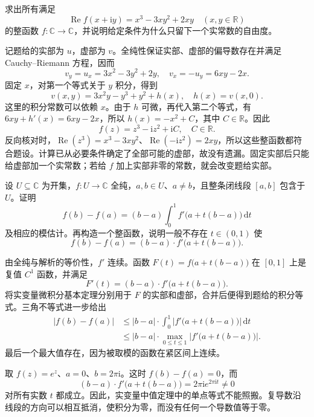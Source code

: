 
\begin{exercise}\label{b3:ex:01-reconstruct-real-part}
求出所有满足
\[
  \operatorname{Re}f(x+\mathrm{i}y)=x^3-3xy^2+2xy
  \quad(x,y\in\mathbb R)
\]
的整函数 \(f:\mathbb C\rightarrow\mathbb C\)，并说明给定条件为什么只留下一个实常数的自由度。
\end{exercise}
\begin{solution}
记题给的实部为 \(u\)，虚部为 \(v\)。全纯性保证实部、虚部的偏导数存在并满足 Cauchy--Riemann 方程，因而
\[
  v_y=u_x=3x^2-3y^2+2y,
  \quad v_x=-u_y=6xy-2x.
\]
固定 \(x\)，对第一个等式关于 \(y\) 积分，得到
\[
  v(x,y)=3x^2y-y^3+y^2+h(x),
  \quad h(x)=v(x,0).
\]
这里的积分常数可以依赖 \(x\)。由于 \(h\) 可微，再代入第二个等式，有
\(6xy+h'(x)=6xy-2x\)，所以 \(h(x)=-x^2+C\)，其中 \(C\in\mathbb R\)。因此
\[
  f(z)=z^3-\mathrm{i}z^2+\mathrm{i}C,
  \quad C\in\mathbb R.
\]
反向核对时，\(\operatorname{Re}(z^3)=x^3-3xy^2\)、\(\operatorname{Re}(-\mathrm{i}z^2)=2xy\)，所以这些整函数都符合题设。计算已从必要条件确定了全部可能的虚部，故没有遗漏。固定实部后只能给虚部加一个实常数；若给 \(f\) 加上实部非零的常数，就会改变题给实部。
\end{solution}

\begin{exercise}\label{b3:ex:01-mean-value-failure}
设 \(U\subseteq\mathbb C\) 为开集，\(f:U\rightarrow\mathbb C\) 全纯，\(a,b\in U\)、\(a\ne b\)，且整条闭线段 \([a,b]\) 包含于 \(U\)。证明
\[
  f(b)-f(a)=(b-a)\int_0^1 f'\bigl(a+t(b-a)\bigr)\,\mathrm{d}t
\]
及相应的模估计。再构造一个整函数，说明一般不存在 \(t\in(0,1)\) 使
\[
  f(b)-f(a)=(b-a)\cdot f'\bigl(a+t(b-a)\bigr).
\]
\end{exercise}
\begin{solution}
由全纯与解析的等价性，\(f'\) 连续。函数
\(F(t)=f\bigl(a+t(b-a)\bigr)\) 在 \([0,1]\) 上是复值 \(C^1\) 函数，并满足
\[
  F'(t)=(b-a)\cdot f'\bigl(a+t(b-a)\bigr).
\]
将实变量微积分基本定理分别用于 \(F\) 的实部和虚部，合并后便得到题给的积分等式。三角不等式进一步给出
\[
\begin{aligned}
  |f(b)-f(a)|
  &\le |b-a|\cdot
       \int_0^1\left|f'\bigl(a+t(b-a)\bigr)\right|\,\mathrm{d}t\\
  &\le |b-a|\cdot
       \max_{0\le t\le1}\left|f'\bigl(a+t(b-a)\bigr)\right|.
\end{aligned}
\]
最后一个最大值存在，因为被取模的函数在紧区间上连续。

取 \(f(z)=e^z\)、\(a=0\)、\(b=2\pi\mathrm{i}\)。这时 \(f(b)-f(a)=0\)，而
\[
  (b-a)\cdot f'\bigl(a+t(b-a)\bigr)
  =2\pi\mathrm{i}e^{2\pi\mathrm{i}t}\ne0
\]
对所有实数 \(t\) 都成立。因此，实变量中值定理中的单点等式不能照搬。复导数沿线段的方向可以相互抵消，使积分为零，而没有任何一个导数值等于零。
\end{solution}

